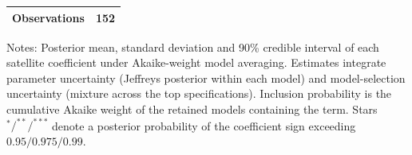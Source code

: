 \begin{table}[!htbp]
\begin{tabular}{lrrrr}
Observations & \multicolumn{4}{r}{152} \\
\bottomrule
\end{tabular}
\begin{tablenotes}\small
\item Notes: Posterior mean, standard deviation and 90\% credible interval of each satellite coefficient under Akaike-weight model averaging. Estimates integrate parameter uncertainty (Jeffreys posterior within each model) and model-selection uncertainty (mixture across the top specifications). Inclusion probability is the cumulative Akaike weight of the retained models containing the term. Stars $^{*}/^{**}/^{***}$ denote a posterior probability of the coefficient sign exceeding $0.95/0.975/0.99$.
\end{tablenotes}
\end{table}
